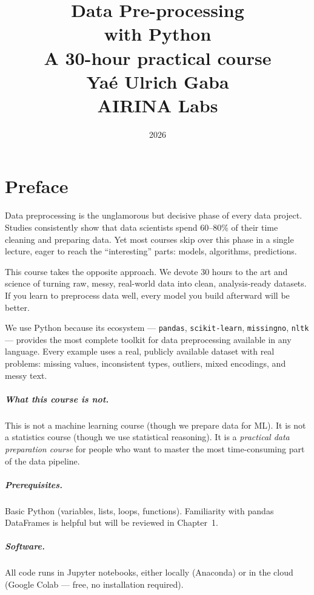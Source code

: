 \documentclass[12pt,a4paper,twoside]{book}
\title{
  \vspace{-2cm}
  {\Huge\bfseries Data Pre-processing}\\[6pt]
  {\LARGE with Python}\\[12pt]
  {\large A 30-hour practical course}\\[24pt]
  {\normalsize Yaé Ulrich Gaba}\\[4pt]
  {\small AIRINA Labs}
}
\date{2026}
\author{}
\begin{document}
\frontmatter
\maketitle

\tableofcontents
\newpage

\chapter*{Preface}

Data preprocessing is the unglamorous but decisive phase of every data project. Studies consistently show that data scientists spend 60--80\% of their time cleaning and preparing data. Yet most courses skip over this phase in a single lecture, eager to reach the ``interesting'' parts: models, algorithms, predictions.

This course takes the opposite approach. We devote 30 hours to the art and science of turning raw, messy, real-world data into clean, analysis-ready datasets. If you learn to preprocess data well, every model you build afterward will be better.

We use Python because its ecosystem --- \texttt{pandas}, \texttt{scikit-learn}, \texttt{missingno}, \texttt{nltk} --- provides the most complete toolkit for data preprocessing available in any language. Every example uses a real, publicly available dataset with real problems: missing values, inconsistent types, outliers, mixed encodings, and messy text.

\paragraph{What this course is not.} This is not a machine learning course (though we prepare data for ML). It is not a statistics course (though we use statistical reasoning). It is a \emph{practical data preparation course} for people who want to master the most time-consuming part of the data pipeline.

\paragraph{Prerequisites.} Basic Python (variables, lists, loops, functions). Familiarity with pandas DataFrames is helpful but will be reviewed in Chapter~1.

\paragraph{Software.} All code runs in Jupyter notebooks, either locally (Anaconda) or in the cloud (Google Colab --- free, no installation required).
\end{document}
